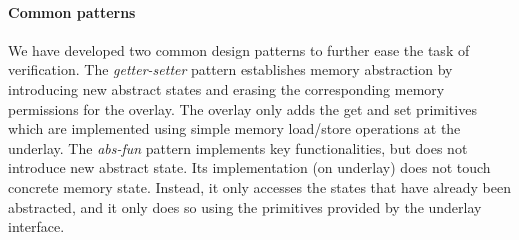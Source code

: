 
\paragraph{Common patterns}
We have developed two common design patterns to further ease the task of
verification. The {\it getter-setter} pattern establishes memory
abstraction by introducing new abstract states and erasing
the corresponding memory permissions for the overlay.
The overlay only adds the \textsf{get}
and \textsf{set} primitives which are implemented using simple
memory load/store operations at the underlay.
The {\it abs-fun} pattern implements key functionalities, but does not
introduce new abstract state. Its implementation (on underlay) does
not touch concrete memory state. Instead, it only accesses the states
that have already been abstracted, and it only does
so using the primitives provided by the underlay interface.

